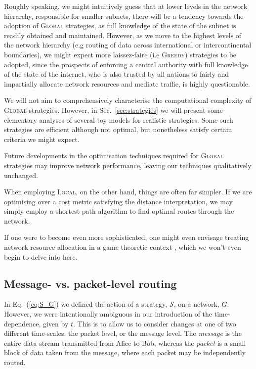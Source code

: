 Roughly speaking, we might intuitively guess that at lower levels in the network hierarchy, responsible for smaller subnets, there will be a tendency towards the adoption of \textsc{Global} strategies, as full knowledge of the state of the subnet is readily obtained and maintained. However, as we move to the highest levels of the network hierarchy (e.g routing of data across international or intercontinental boundaries), we might expect more laissez-faire (i.e \textsc{Greedy}) strategies to be adopted, since the prospects of enforcing a central authority with full knowledge of the state of the internet, who is also trusted by all nations to fairly and impartially allocate network resources and mediate traffic, is highly questionable.

We will not aim to comprehensively characterise the computational complexity of \textsc{Global} strategies. However, in Sec.~\ref{sec:strategies} we will present some elementary analyses of several toy models for realistic strategies. Some such strategies are efficient although not optimal, but nonetheless satisfy certain criteria we might expect.

Future developments in the optimisation techniques required for \textsc{Global} strategies may improve network performance, leaving our techniques qualitatively unchanged.

When employing \textsc{Local}, on the other hand, things are often far simpler. If we are optimising over a cost metric satisfying the distance interpretation, we may simply employ a shortest-path algorithm to find optimal routes through the network.

If one were to become even more sophisticated, one might even envisage treating network resource allocation in a game theoretic context \cite{???}, which we won't even begin to delve into here.

%
%

\subsection{Message- vs. packet-level routing}

In Eq.~(\ref{eq:S_G}) we defined the action of a strategy, $\mathcal{S}$, on a network, $G$. However, we were intentionally ambiguous in our introduction of the time-dependence, given by $t$. This is to allow us to consider changes at one of two different time-scales: the packet level, or the message level. The \textit{message} is the entire data stream transmitted from Alice to Bob, whereas the \textit{packet} is a small block of data taken from the message, where each packet may be independently routed.

